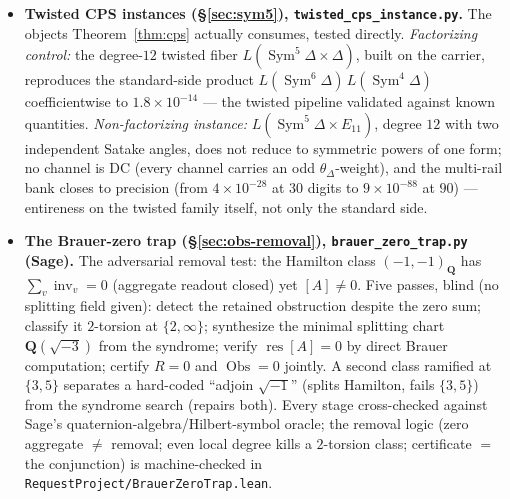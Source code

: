 \documentclass[11pt]{article}
\theoremstyle{definition}
\newcommand{\Sym}{\operatorname{Sym}}
\begin{document}
\begin{itemize}
\item \textbf{Twisted CPS instances (\S\ref{sec:sym5}), \texttt{twisted\_cps\_instance.py}.} The objects
Theorem~\ref{thm:cps} actually consumes, tested directly. \emph{Factorizing control:} the degree-$12$ twisted
fiber $L(\Sym^5\Delta\times\Delta)$, built on the carrier, reproduces the standard-side product
$L(\Sym^6\Delta)\,L(\Sym^4\Delta)$ coefficientwise to $1.8\times10^{-14}$ --- the twisted pipeline validated
against known quantities. \emph{Non-factorizing instance:} $L(\Sym^5\Delta\times E_{11})$, degree $12$ with two
independent Satake angles, does not reduce to symmetric powers of one form; no channel is DC (every channel
carries an odd $\theta_\Delta$-weight), and the multi-rail bank closes to precision (from $4\times10^{-28}$ at
$30$ digits to $9\times10^{-88}$ at $90$) --- entireness on the twisted family itself, not only the standard side.

\item \textbf{The Brauer-zero trap (\S\ref{sec:obs-removal}), \texttt{brauer\_zero\_trap.py} (Sage).} The
adversarial removal test: the Hamilton class $(-1,-1)_{\mathbf Q}$ has $\sum_v\operatorname{inv}_v=0$ (aggregate
readout closed) yet $[A]\neq0$. Five passes, blind (no splitting field given): detect the retained obstruction
despite the zero sum; classify it $2$-torsion at $\{2,\infty\}$; synthesize the minimal splitting chart
$\mathbf Q(\sqrt{-3})$ from the syndrome; verify $\operatorname{res}[A]=0$ by direct Brauer computation; certify
$R{=}0$ and $\operatorname{Obs}{=}0$ jointly. A second class ramified at $\{3,5\}$ separates a hard-coded
``adjoin $\sqrt{-1}$'' (splits Hamilton, fails $\{3,5\}$) from the syndrome search (repairs both). Every stage
cross-checked against Sage's quaternion-algebra/Hilbert-symbol oracle; the removal logic (zero aggregate $\ne$ removal; even local degree kills a $2$-torsion class; certificate $=$ the conjunction) is machine-checked in \texttt{RequestProject/BrauerZeroTrap.lean}.


\end{itemize}
\end{document}
